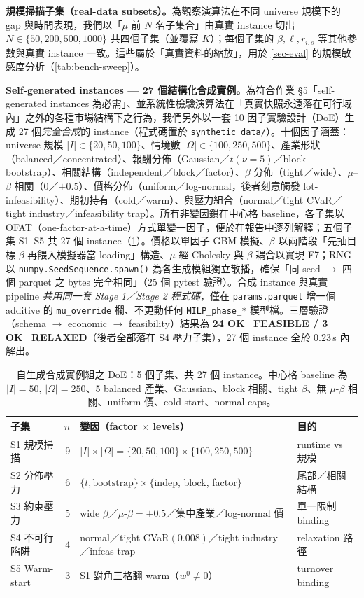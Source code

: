 \documentclass[11pt,a4paper]{article}
\begin{document}
\textbf{規模掃描子集（real-data subsets）。}{}為觀察演算法在不同 universe 規模下的 gap 與時間表現，我們以「$\mu$ 前 $N$ 名子集合」由真實 instance 切出 $N \in \{50, 200, 500, 1000\}$ 共四個子集（並覆寫 $K$）；每個子集的 $\beta, \ell, r_{i,s}$ 等其他參數與真實 instance 一致。這些屬於「真實資料的縮放」，用於 \cref{sec-eval} 的規模敏感度分析（\cref{tab:bench-sweep}）。

\textbf{Self-generated instances — 27 個結構化合成實例。}{}為符合作業 §5「self-generated instances 為必需」、並系統性檢驗演算法在「真實快照永遠落在可行域內」之外的各種市場結構下之行為，我們另外以一套 10 因子實驗設計（DoE）生成 27 個\emph{完全合成}的 instance（程式碼置於 \texttt{synthetic\_data/}）。十個因子涵蓋：universe 規模 $|I|\in\{20,50,100\}$、情境數 $|\Omega|\in\{100,250,500\}$、產業形狀（balanced／concentrated）、報酬分佈（Gaussian／$t(\nu{=}5)$／block-bootstrap）、相關結構（independent／block／factor）、$\beta$ 分佈（tight／wide）、$\mu$–$\beta$ 相關（$0$／$\pm0.5$）、價格分佈（uniform／log-normal，後者刻意觸發 lot-infeasibility）、期初持有（cold／warm）、與壓力組合（normal／tight CVaR／tight industry／infeasibility trap）。所有非變因鎖在中心格 baseline，各子集以 OFAT（one-factor-at-a-time）方式單變一因子，便於在報告中逐列解釋；五個子集 S1–S5 共 27 個 instance（\cref{tab:synth-doe}）。價格以單因子 GBM 模擬、$\beta$ 以兩階段「先抽目標 $\beta$ 再餵入模擬器當 loading」構造、$\mu$ 經 Cholesky 與 $\beta$ 耦合以實現 F7；RNG 以 \texttt{numpy.SeedSequence.spawn()} 為各生成模組獨立散播，確保「同 seed $\to$ 四個 parquet 之 bytes 完全相同」（25 個 pytest 驗證）。合成 instance 與真實 pipeline \emph{共用同一套 Stage 1／Stage 2 程式碼}，僅在 \texttt{params.parquet} 增一個 additive 的 \texttt{mu\_override} 欄、不更動任何 \texttt{MILP\_phase\_*} 模型檔。三層驗證（schema $\to$ economic $\to$ feasibility）結果為 \textbf{24 OK\_FEASIBLE / 3 OK\_RELAXED}（後者全部落在 S4 壓力子集），27 個 instance 全於 $0.23$\,s 內解出。

\begin{table}[!hbt]
\centering
\small
\begin{tabular}{l r p{} p{}}
\toprule
子集 & $n$ & 變因（factor $\times$ levels） & 目的 \\
\midrule
S1 規模掃描   & 9 & $|I|\times|\Omega| = \{20,50,100\}\times\{100,250,500\}$ & runtime vs 規模 \\
S2 分佈壓力   & 6 & $\{t,\text{bootstrap}\}\times\{$indep, block, factor$\}$ & 尾部／相關結構 \\
S3 約束壓力   & 5 & wide $\beta$／$\mu$-$\beta=\pm0.5$／集中產業／log-normal 價 & 單一限制 binding \\
S4 不可行陷阱 & 4 & normal／tight CVaR$(0.008)$／tight industry／infeas trap & relaxation 路徑 \\
S5 Warm-start & 3 & S1 對角三格翻 warm（$w^0\neq0$） & turnover binding \\
\bottomrule
\end{tabular}
\caption{自生成合成實例組之 DoE：5 個子集、共 27 個 instance。中心格 baseline 為 $|I|=50,\,|\Omega|=250$、5 balanced 產業、Gaussian、block 相關、tight $\beta$、無 $\mu$-$\beta$ 相關、uniform 價、cold start、normal caps。}
\label{tab:synth-doe}
\end{table}
\end{document}
